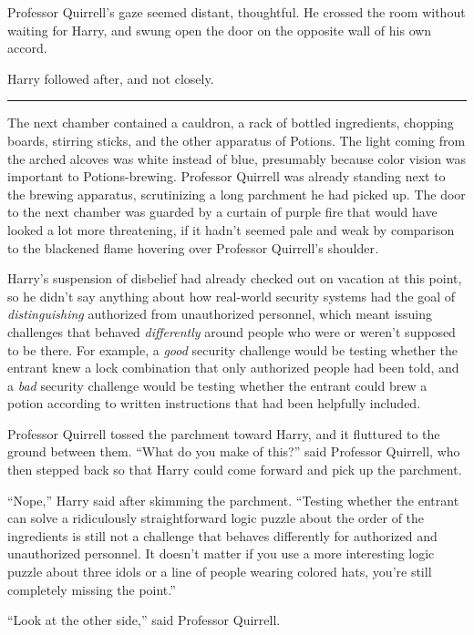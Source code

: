 Professor Quirrell's gaze seemed distant, thoughtful. He crossed the room without waiting for Harry, and swung open the door on the opposite wall of his own accord.

Harry followed after, and not closely.

\begin{center}\rule{3in}{0.4pt}\end{center}

The next chamber contained a cauldron, a rack of bottled ingredients, chopping boards, stirring sticks, and the other apparatus of Potions. The light coming from the arched alcoves was white instead of blue, presumably because color vision was important to Potions-brewing. Professor Quirrell was already standing next to the brewing apparatus, scrutinizing a long parchment he had picked up. The door to the next chamber was guarded by a curtain of purple fire that would have looked a lot more threatening, if it hadn't seemed pale and weak by comparison to the blackened flame hovering over Professor Quirrell's shoulder\emph{.}

Harry's suspension of disbelief had already checked out on vacation at this point, so he didn't say anything about how real-world security systems had the goal of \emph{distinguishing} authorized from unauthorized personnel, which meant issuing challenges that behaved \emph{differently} around people who were or weren't supposed to be there. For example, a \emph{good} security challenge would be testing whether the entrant knew a lock combination that only authorized people had been told, and a \emph{bad} security challenge would be testing whether the entrant could brew a potion according to written instructions that had been helpfully included.

Professor Quirrell tossed the parchment toward Harry, and it fluttured to the ground between them. ``What do you make of this?'' said Professor Quirrell, who then stepped back so that Harry could come forward and pick up the parchment.

``Nope,'' Harry said after skimming the parchment. ``Testing whether the entrant can solve a ridiculously straightforward logic puzzle about the order of the ingredients is still not a challenge that behaves differently for authorized and unauthorized personnel. It doesn't matter if you use a more interesting logic puzzle about three idols or a line of people wearing colored hats, you're still completely missing the point.''

``Look at the other side,'' said Professor Quirrell.

